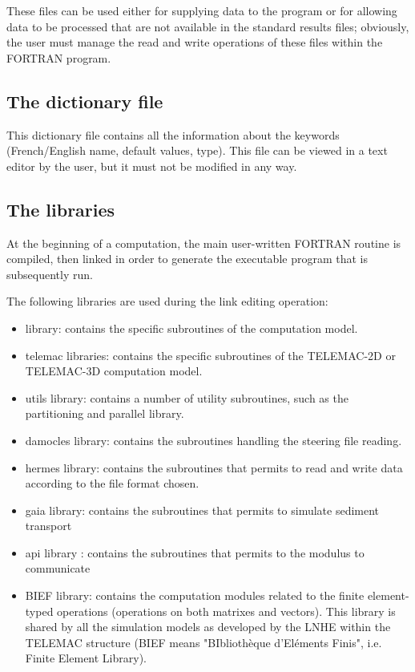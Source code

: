 These files can be used either for supplying data to the program or for allowing data
to be processed that are not available in the standard results files; obviously, the
user must manage the read and write operations of these files within the FORTRAN program.


\subsection{ The dictionary file}

This dictionary file contains all the information about the keywords (French/English
name, default values, type). This file can be viewed in a text editor by the user,
but it must not be modified in any way.


\subsection{ The libraries}

At the beginning of a computation, the main user-written FORTRAN routine is compiled,
then linked in order to generate the executable program that is subsequently run.

 The following libraries are used during the link editing operation:

\begin{itemize}
\item  \tomawac library: contains the specific subroutines of the \tomawac computation
  model.

\item  telemac libraries: contains the specific subroutines of the TELEMAC-2D or
  TELEMAC-3D computation model.

\item  utils library: contains a number of utility subroutines, such as the partitioning
  and parallel library.

\item  damocles library: contains the subroutines handling the steering file reading.

\item  hermes library: contains the subroutines that permits to read and write data
  according to the file format chosen.

\item  gaia library: contains the subroutines that permits to simulate sediment
  transport

\item  api library : contains the subroutines that permits to the modulus to communicate

\item  BIEF library: contains the computation modules related to the finite
  element-typed operations (operations on both matrixes and vectors). This library is
  shared by all the simulation models as developed by the LNHE within the TELEMAC
  structure (BIEF means "BIbliothèque d'Eléments Finis", i.e. Finite Element Library).
\end{itemize}



